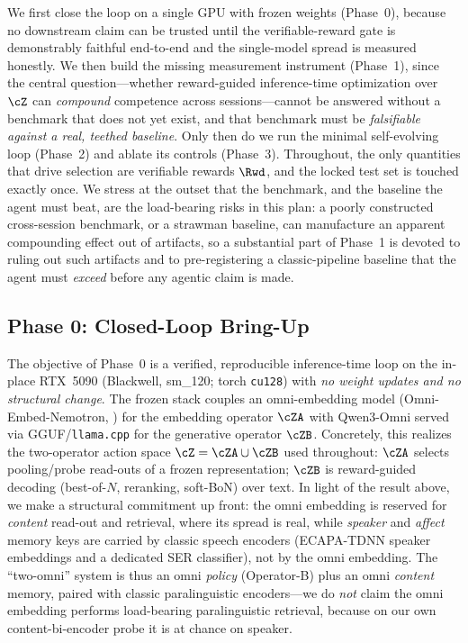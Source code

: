 We first close the loop on a single GPU with frozen weights (Phase~0), because no downstream claim can be trusted until the verifiable-reward gate is demonstrably faithful end-to-end and the single-model spread is measured honestly. We then build the missing measurement instrument (Phase~1), since the central question---whether reward-guided inference-time optimization over $\cZ$ can \emph{compound} competence across sessions---cannot be answered without a benchmark that does not yet exist, and that benchmark must be \emph{falsifiable against a real, teethed baseline}. Only then do we run the minimal self-evolving loop (Phase~2) and ablate its controls (Phase~3). Throughout, the only quantities that drive selection are verifiable rewards $\Rwd$, and the locked test set is touched exactly once. We stress at the outset that the benchmark, and the baseline the agent must beat, are the load-bearing risks in this plan: a poorly constructed cross-session benchmark, or a strawman baseline, can manufacture an apparent compounding effect out of artifacts, so a substantial part of Phase~1 is devoted to ruling out such artifacts and to pre-registering a classic-pipeline baseline that the agent must \emph{exceed} before any agentic claim is made.

\subsection{Phase 0: Closed-Loop Bring-Up}
\label{sub:phase0}

The objective of Phase~0 is a verified, reproducible inference-time loop on the in-place RTX~5090 (Blackwell, sm\_120; torch \texttt{cu128}) with \emph{no weight updates and no structural change}. The frozen stack couples an omni-embedding model (Omni-Embed-Nemotron, \citealp{omniembed2025,omniembedaudio2026}) for the embedding operator $\cZA$ with Qwen3-Omni \citep{qwen3omni} served via GGUF/\texttt{llama.cpp} for the generative operator $\cZB$. Concretely, this realizes the two-operator action space $\cZ = \cZA \cup \cZB$ used throughout: $\cZA$ selects pooling/probe read-outs of a frozen representation; $\cZB$ is reward-guided decoding (best-of-$N$, reranking, soft-BoN) over text. In light of the result above, we make a structural commitment up front: the omni embedding is reserved for \emph{content} read-out and retrieval, where its spread is real, while \emph{speaker} and \emph{affect} memory keys are carried by classic speech encoders (ECAPA-TDNN speaker embeddings \citealp{ecapatdnn2020} and a dedicated SER classifier), not by the omni embedding. The ``two-omni'' system is thus an omni \emph{policy} (Operator-B) plus an omni \emph{content} memory, paired with classic paralinguistic encoders---we do \emph{not} claim the omni embedding performs load-bearing paralinguistic retrieval, because on our own content-bi-encoder probe it is at chance on speaker.

